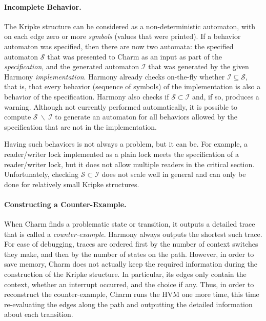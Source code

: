 \documentclass[twocolumn]{article}
\begin{document}
\paragraph{Incomplete Behavior.}

The Kripke structure can be considered as a non-deterministic
automaton, with on each edge zero or more \emph{symbols} (values
that were printed).  If a behavior automaton was specified,
then there are now two automata: the specified automaton
${\mathcal S}$ that was presented to Charm as an input as
part of the \emph{specification}, and the generated automaton
${\mathcal I}$ that was generated by the given Harmony
\emph{implementation}.  Harmony already checks on-the-fly whether
${\mathcal I} \subseteq {\mathcal S}$, that is, that every
behavior (sequence of symbols) of the implementation is also a
behavior of the specification.  Harmony also checks if
${\mathcal S} \subset {\mathcal I}$ and, if so,
produces a warning.
Although not currently performed automatically, it is possible to compute
${\mathcal S}~\backslash~{\mathcal I}$
to generate an automaton for all behaviors allowed by the
specification that are not in the implementation.

Having such behaviors is not always a problem, but it can be.  For
example, a reader/writer lock implemented as a plain lock meets the
specification of a reader/writer lock, but it does not allow multiple
readers in the critical section.  Unfortunately, checking ${\mathcal
S} \subset {\mathcal I}$ does not scale well in general and can
only be done for relatively small Kripke structures.

\paragraph{Constructing a Counter-Example.}

When Charm finds a problematic state or transition, it outputs
a detailed trace that is called a \emph{counter-example}.
Harmony always outputs the shortest such trace.
For ease of debugging, traces are ordered first by the number of
context switches they make, and then by the number of states on
the path.
However, in order to save memory, Charm does not actually keep
the required information during the construction of the Kripke
structure.  In particular, its edges only contain the context,
whether an interrupt occurred, and the choice if any.
Thus, in order to reconstruct the
counter-example, Charm runs the HVM one more time, this time
re-evaluating the edges along the path and outputting the
detailed information about each transition.
\end{document}
